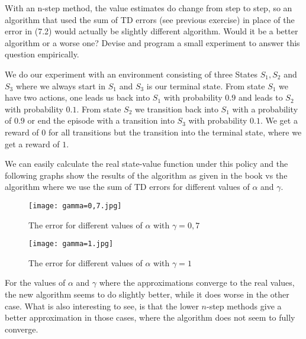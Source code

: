 
\begin{exercise}

With an n-step method, the value estimates do change from step to step, so an algorithm that used the sum of TD errors (see previous exercise) in place of the error in (7.2) would actually be slightly different algorithm. Would it be a better algorithm or a worse one? Devise and program a small experiment to answer this question empirically.

\end{exercise}


\begin{solution}

We do our experiment with an environment consisting of three States $S_1,S_2$ and $S_3$ where we always start in $S_1$ and $S_3$ is our terminal state. From state $S_1$ we have two actions, one leads us back into $S_1$ with probability $0.9$ and leads to $S_2$ with probability $0.1$. From state $S_2$ we transition back into $S_1$ with a probability of $0.9$ or end the episode with a transition into $S_3$ with probability $0.1$. We get a reward of $0$ for all transitions but the transition into the terminal state, where we get a reward of $1$.

We can easily calculate the real state-value function under this policy and the following graphs show the results of the algorithm as given in the book vs the algorithm where we use the sum of TD errors for different values of $\alpha$ and $\gamma$.
\begin{center}
  \begin{figure}[H]
    \texttt{[image: gamma=0,7.jpg]}
    \caption{The error for different values of $\alpha$ with $\gamma = 0,7$}
  \end{figure}

  \begin{figure}[H]
  \texttt{[image: gamma=1.jpg]}
    \caption{The error for different values of $\alpha$ with $\gamma = 1$}
  \end{figure}
\end{center}

For the values of $\alpha$ and $\gamma$ where the approximations converge to the real values, the new algorithm seems to do slightly better, while it does worse in the other case. What is also interesting to see, is that the lower $n$-step methods give a better approximation in those cases, where the algorithm does not seem to fully converge.
\end{solution}

